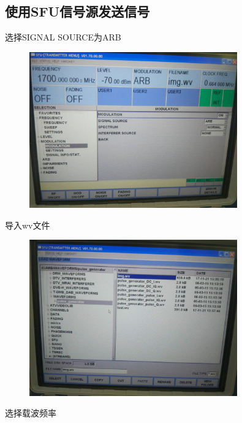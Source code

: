 \documentclass[UTF8]{ctexart}
\begin{document}
\subsection{使用SFU信号源发送信号}

选择SIGNAL SOURCE为ARB

\begin{figure}[H]
        \centering
        \includegraphics[width=0.8\textwidth]{images//setARB.jpg}
\end{figure}

导入wv文件

\begin{figure}[H]
        \centering
        \includegraphics[width=0.8\textwidth]{images//loadwv.jpg}
\end{figure}

选择载波频率
\end{document}

